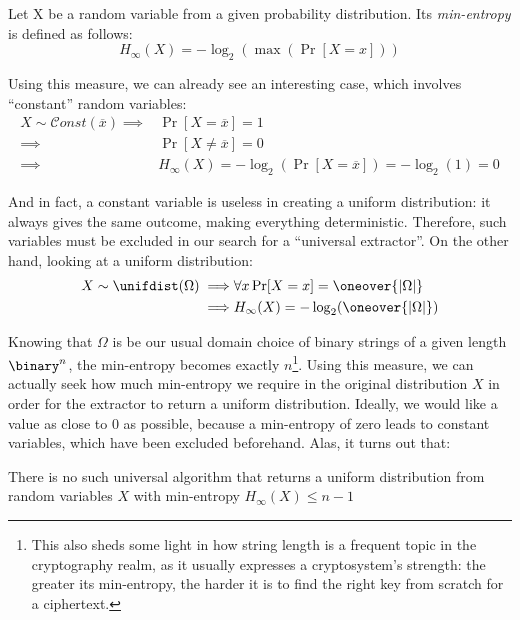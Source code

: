 \begin{definition} Let X be a random variable from a given probability distribution. Its \emph{min-entropy} is defined as follows:
    \[
        H_{\infty}(X) = -\log_2(\max(\Pr[X = x]))
    \]
\end{definition}

Using this measure, we can already see an interesting case, which involves ``constant'' random variables:
\begin{align*}
    X \sim \mathcal{C}onst(\overline{x}) \implies& \Pr[X = \overline{x}] = 1 \\
    \implies& \Pr[X \neq \overline{x}] = 0 \\
    \implies& H_{\infty}(X) = -\log_2(\Pr[X = \overline{x}]) = -\log_2(1) = 0
\end{align*}

And in fact, a constant variable is useless in creating a uniform distribution: it always gives the same outcome, making everything deterministic. Therefore, such variables must be excluded in our search for a ``universal extractor''.
On the other hand, looking at a uniform distribution:
\begin{align*}
    X \sim \unifdist(\Omega) \implies& \forall x \Pr[X = x] = \oneover{|\Omega|} \\
    \implies& H_{\infty}(X) = -\log_2(\oneover{|\Omega|})
\end{align*}

Knowing that $\Omega$ is be our usual domain choice of binary strings of a given length $\binary^n$, the min-entropy becomes exactly $n$\footnote{This also sheds some light in how string length is a frequent topic in the cryptography realm, as it usually expresses a cryptosystem's strength: the greater its min-entropy, the harder it is to find the right key from scratch for a ciphertext.}.
Using this measure, we can actually seek how much min-entropy we require in the original distribution $X$ in order for the extractor to return a uniform distribution. Ideally, we would like a value as close to 0 as possible, because a min-entropy of zero leads to constant variables, which have been excluded beforehand. Alas, it turns out that:
\begin{claim}
    There is no such universal \ext{} algorithm that returns a uniform distribution from random variables $X$ with min-entropy $H_{\infty}(X) \leq n - 1$
\end{claim}

